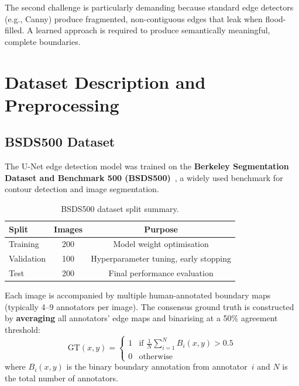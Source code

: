 \documentclass[12pt, a4paper]{article}
\begin{document}
The second challenge is particularly demanding because standard edge detectors (e.g., Canny) produce fragmented, non-contiguous edges that leak when flood-filled.
A learned approach is required to produce semantically meaningful, complete boundaries.

\section{Dataset Description and Preprocessing}

\subsection{BSDS500 Dataset}

The U-Net edge detection model was trained on the \textbf{Berkeley Segmentation Dataset and Benchmark 500 (BSDS500)}~\cite{bsds500}, a widely used benchmark for contour detection and image segmentation.

\begin{table}[H]
    \centering
    \caption{BSDS500 dataset split summary.}
    \label{tab:dataset}
    \begin{tabular}{lcc}
        \toprule
        \textbf{Split} & \textbf{Images} & \textbf{Purpose} \\
        \midrule
        Training       & 200             & Model weight optimisation \\
        Validation     & 100             & Hyperparameter tuning, early stopping \\
        Test           & 200             & Final performance evaluation \\
        \bottomrule
    \end{tabular}
\end{table}

Each image is accompanied by multiple human-annotated boundary maps (typically 4--9 annotators per image).
The consensus ground truth is constructed by \textbf{averaging} all annotators' edge maps and binarising at a 50\% agreement threshold:
\[
    \text{GT}(x, y) =
    \begin{cases}
        1 & \text{if } \frac{1}{N} \sum_{i=1}^{N} B_i(x, y) > 0.5 \\
        0 & \text{otherwise}
    \end{cases}
\]
where $B_i(x, y)$ is the binary boundary annotation from annotator~$i$ and $N$ is the total number of annotators.
\end{document}
